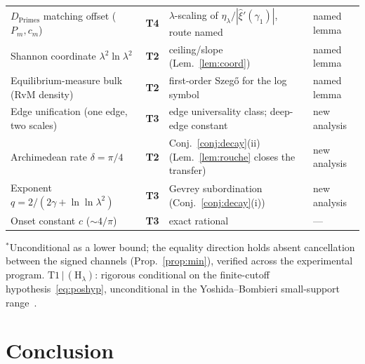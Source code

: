 \documentclass[11pt,a4paper]{article}
\begin{document}
\begin{table}[H]
{\begin{tabular}{@{}l l p{4.9cm} l@{}}
$D_{\mathrm{Primes}}$ matching offset ($P_m,c_m$) & \textbf{T4} & $\lambda$-scaling of $\eta_\lambda/|\widehat\xi'(\gamma_1)|$, route named & named lemma \\
Shannon coordinate $\lambda^2\ln\lambda^2$ & \textbf{T2} & ceiling/slope (Lem.~\ref{lem:coord}) & named lemma \\
Equilibrium-measure bulk (RvM density) & \textbf{T2} & first-order Szeg\H{o} for the log symbol & named lemma \\
Edge unification (one edge, two scales) & \textbf{T3} & edge universality class; deep-edge constant & new analysis \\
Archimedean rate $\delta=\pi/4$ & \textbf{T2} & Conj.~\ref{conj:decay}(ii) (Lem.~\ref{lem:rouche} closes the transfer) & new analysis \\
Exponent $q=2/(2\gamma+\ln\ln\lambda^2)$ & \textbf{T3} & Gevrey subordination (Conj.~\ref{conj:decay}(i)) & new analysis \\
Onset constant $c$ ($\sim 4/\pi$) & \textbf{T3} & exact rational & --- \\
\bottomrule
\end{tabular}}
\medskip

{\footnotesize $^\ast$Unconditional as a lower bound; the equality direction
holds absent cancellation between the signed channels
(Prop.~\ref{prop:min}), verified across the experimental program.
$\mathrm{T1}\,|\,(\mathrm{H}_\lambda)$: rigorous conditional on the
finite-cutoff hypothesis~\eqref{eq:poshyp}, unconditional in the
Yoshida--Bombieri small-support range~\cite{Yoshida1992,Bombieri2000}.}
\end{table}

\section{Conclusion}\label{sec:conclusion}
\end{document}
